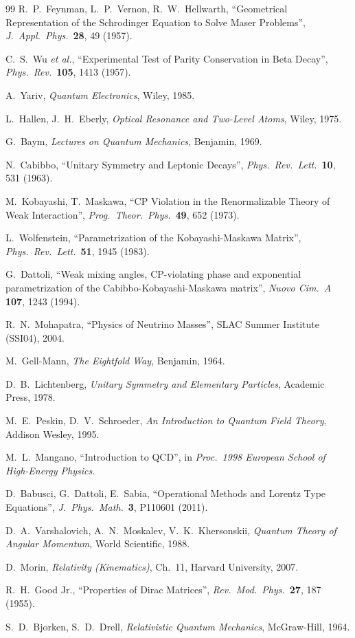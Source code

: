 \begin{thebibliography}{99}
 R.~P.~Feynman, L.~P.~Vernon, R.~W.~Hellwarth,
``Geometrical Representation of the Schrodinger Equation to Solve Maser Problems'', \emph{J.\ Appl.\ Phys.}\ \textbf{28}, 49 (1957).

 C.~S.~Wu \emph{et al.}, ``Experimental Test of Parity Conservation in Beta Decay'', \emph{Phys.\ Rev.}\ \textbf{105}, 1413 (1957).

 A.~Yariv, \emph{Quantum Electronics}, Wiley, 1985.

 L.~Hallen, J.~H.~Eberly, \emph{Optical Resonance and Two-Level Atoms}, Wiley, 1975.

 G.~Baym, \emph{Lectures on Quantum Mechanics}, Benjamin, 1969.

 N.~Cabibbo, ``Unitary Symmetry and Leptonic Decays'', \emph{Phys.\ Rev.\ Lett.}\ \textbf{10}, 531 (1963).

 M.~Kobayashi, T.~Maskawa,
``CP Violation in the Renormalizable Theory of Weak Interaction'', \emph{Prog.\ Theor.\ Phys.}\ \textbf{49}, 652 (1973).

 L.~Wolfenstein, ``Parametrization of the Kobayashi-Maskawa Matrix'', \emph{Phys.\ Rev.\ Lett.}\ \textbf{51}, 1945 (1983).

 G.~Dattoli, ``Weak mixing angles, CP-violating phase and exponential parametrization of the Cabibbo-Kobayashi-Maskawa matrix'', \emph{Nuovo Cim.\ A} \textbf{107}, 1243 (1994).

 R.~N.~Mohapatra, ``Physics of Neutrino Masses'', SLAC Summer Institute (SSI04), 2004.

 M.~Gell-Mann, \emph{The Eightfold Way}, Benjamin, 1964.

 D.~B.~Lichtenberg, \emph{Unitary Symmetry and Elementary Particles}, Academic Press, 1978.

 M.~E.~Peskin, D.~V.~Schroeder, \emph{An Introduction to Quantum Field Theory}, Addison Wesley, 1995.

 M.~L.~Mangano, ``Introduction to QCD'', in \emph{Proc.\ 1998 European School of High-Energy Physics}.

 D.~Babusci, G.~Dattoli, E.~Sabia,
``Operational Methods and Lorentz Type Equations'', \emph{J.\ Phys.\ Math.}\ \textbf{3}, P110601 (2011).

 D.~A.~Varshalovich, A.~N.~Moskalev, V.~K.~Khersonskii,
\emph{Quantum Theory of Angular Momentum}, World Scientific, 1988.

 D.~Morin, \emph{Relativity (Kinematics)}, Ch.~11, Harvard University, 2007.

 R.~H.~Good Jr., ``Properties of Dirac Matrices'', \emph{Rev.\ Mod.\ Phys.}\ \textbf{27}, 187 (1955).

 S.~D.~Bjorken, S.~D.~Drell, \emph{Relativistic Quantum Mechanics}, McGraw-Hill, 1964.

\end{thebibliography}
